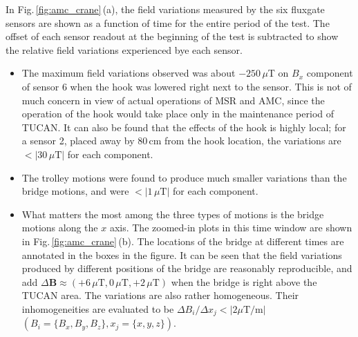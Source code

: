 In Fig.\,\ref{fig:amc_crane}\,(a), the field variations measured by the six fluxgate sensors are shown as a function of time for the entire period of the test. The offset of each sensor readout at the beginning of the test is subtracted to show the relative field variations experienced bye each sensor. 
\begin{itemize}
\item The maximum field variations observed was about $-250\,\mu$T on $B_{x}$ component of sensor 6 when the hook was lowered right next to the sensor. This is not of much concern in view of actual operations of MSR and AMC, since the operation of the hook would take place only in the maintenance period of TUCAN. It can also be found that the effects of the hook is highly local; for a sensor 2, placed away by 80\,cm from the hook location, the variations are $<\left|30\,\mu\mathrm{T}\right|$ for each component. 
\item The trolley motions were found to produce much smaller variations than the bridge motions, and were $<|1\,\mu\mathrm{T}|$ for each component. 
\item What matters the most among the three types of motions is the bridge motions along the $x$ axis. The zoomed-in plots in this time window are shown in Fig.\,\ref{fig:amc_crane}\,(b).  The locations of the bridge at different times are annotated in the boxes in the figure. It can be seen that the field variations produced by different positions of the bridge are reasonably reproducible, and add $\Delta \mathbf{B}\approx (+6\,\mu\mathrm{T}, 0\,\mu\mathrm{T},+2\,\mu\mathrm{T})$ when the bridge is right above the TUCAN area. The variations are also rather homogeneous. Their inhomogeneities are  evaluated to be  $\Delta B_{i}/\Delta x_{j} < \left|2 \mu \mathrm{T}/ \mathrm{m}\right|$ $( B_{i}= \{B_{x}, B_{y}, B_{z}\}, x_{j}=\{x,y,z\})$.
\end{itemize}

